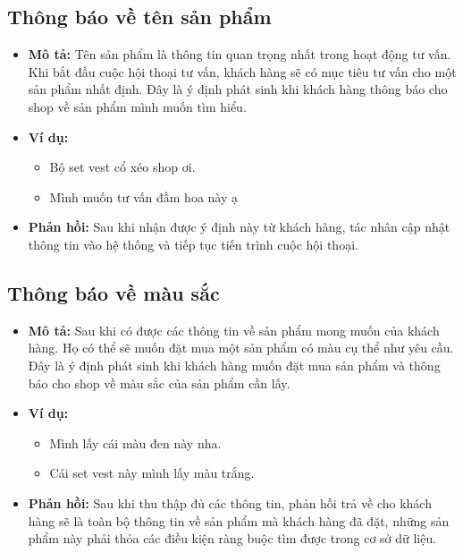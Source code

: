 \subsection{Thông báo về tên sản phẩm}
\begin{itemize}
    \item \textbf{Mô tả:} Tên sản phẩm là thông tin quan trọng nhất
    trong hoạt động tư vấn. Khi bắt đầu cuộc hội thoại tư vấn,
    khách hàng sẽ có mục tiêu tư vấn cho một sản phẩm nhất định.
    Đây là ý định phát sinh khi khách hàng thông báo cho shop về
    sản phẩm mình muốn tìm hiểu.
    \item \textbf{Ví dụ:}
    \begin{itemize}
        \item Bộ set vest cổ xéo shop ơi.
        \item Mình muốn tư vấn đầm hoa này ạ
    \end{itemize}
    \item \textbf{Phản hồi:} Sau khi nhận được ý định này từ
    khách hàng, tác nhân cập nhật thông tin vào hệ thống và
    tiếp tục tiến trình cuộc hội thoại.
\end{itemize}

\subsection{Thông báo về màu sắc}
\begin{itemize}
    \item \textbf{Mô tả:} Sau khi có được các thông tin về sản phẩm
    mong muốn của khách hàng. Họ có thể sẽ muốn đặt mua một sản phẩm
    có màu cụ thể như yêu cầu. Đây là ý định phát sinh khi khách hàng
    muốn đặt mua sản phẩm và thông báo cho shop về màu sắc của
    sản phẩm cần lấy.
    \item \textbf{Ví dụ:}
    \begin{itemize}
        \item Mình lấy cái màu đen này nha.
        \item Cái set vest này mình lấy màu trắng.
    \end{itemize}
    \item \textbf{Phản hồi:} Sau khi thu thập đủ các thông tin,
    phản hồi trả về cho khách hàng sẽ là toàn bộ thông tin về
    sản phẩm mà khách hàng đã đặt, những sản phẩm này phải thỏa
    các điều kiện ràng buộc tìm được trong cơ sở dữ liệu.
\end{itemize}

